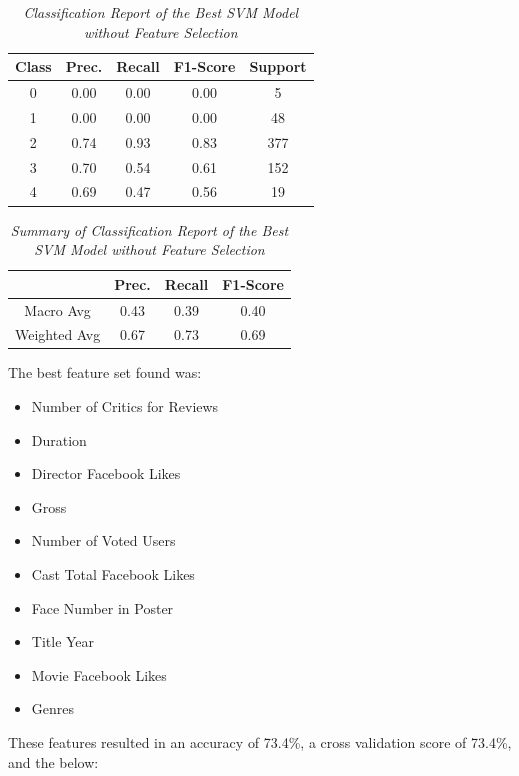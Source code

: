 \documentclass[11pt]{article}
\begin{document}
\begin{table}[!ht]
    \begin{center}
        \begin{tabular}{c|c|c|c|c}			
            \hline
            Class & Prec. & Recall & F1-Score & Support \\
            \hline\hline
            0 & 0.00 & 0.00 & 0.00 & 5 \\
            1 & 0.00 & 0.00 & 0.00 & 48 \\
            2 & 0.74 & 0.93 & 0.83 & 377 \\
            3 & 0.70 & 0.54 & 0.61 & 152 \\
            4 & 0.69 & 0.47 & 0.56 & 19\\
                \hline
        \end{tabular}

        \caption{\textit{Classification Report of the Best SVM Model without Feature Selection}}
        \label{svm-report}

    \end{center}
\end{table}
\begin{table}[!ht]
    \begin{center}
        \begin{tabular}{c||c|c|c}			
            \hline
             & Prec. & Recall & F1-Score \\
            \hline\hline
            Macro Avg & 0.43 & 0.39 & 0.40 \\
            Weighted Avg & 0.67 & 0.73 & 0.69 \\
                \hline
        \end{tabular}

        \caption{\textit{Summary of Classification Report of the Best SVM Model without Feature Selection}}
        \label{svm-report-sum}

    \end{center}
\end{table}
\noindent
The best feature set found was:
\begin{itemize}
    \item Number of Critics for Reviews
    \item Duration
    \item Director Facebook Likes
    \item Gross
    \item Number of Voted Users
    \item Cast Total Facebook Likes
    \item Face Number in Poster
    \item Title Year
    \item Movie Facebook Likes
    \item Genres
\end{itemize}
\noindent
These features resulted in an accuracy of 73.4\%, a cross validation score of 73.4\%, and the below:
\end{document}
